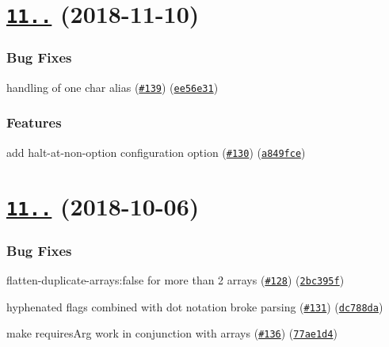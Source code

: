 \label{_11.1.0}%
 \section*{\href{https://github.com/yargs/yargs-parser/compare/v11.0.0...v11.1.0}{\tt 11..} (2018-\/11-\/10)}

\subsubsection*{Bug Fixes}


\begin{DoxyItemize}
\item handling of one char alias (\href{https://github.com/yargs/yargs-parser/issues/139}{\tt \#139}) (\href{https://github.com/yargs/yargs-parser/commit/ee56e31}{\tt ee56e31})
\end{DoxyItemize}

\subsubsection*{Features}


\begin{DoxyItemize}
\item add halt-\/at-\/non-\/option configuration option (\href{https://github.com/yargs/yargs-parser/issues/130}{\tt \#130}) (\href{https://github.com/yargs/yargs-parser/commit/a849fce}{\tt a849fce})
\end{DoxyItemize}

\label{_11.0.0}%
 \section*{\href{https://github.com/yargs/yargs-parser/compare/v10.1.0...v11.0.0}{\tt 11..} (2018-\/10-\/06)}

\subsubsection*{Bug Fixes}


\begin{DoxyItemize}
\item flatten-\/duplicate-\/arrays\+:false for more than 2 arrays (\href{https://github.com/yargs/yargs-parser/issues/128}{\tt \#128}) (\href{https://github.com/yargs/yargs-parser/commit/2bc395f}{\tt 2bc395f})
\item hyphenated flags combined with dot notation broke parsing (\href{https://github.com/yargs/yargs-parser/issues/131}{\tt \#131}) (\href{https://github.com/yargs/yargs-parser/commit/dc788da}{\tt dc788da})
\item make requires\+Arg work in conjunction with arrays (\href{https://github.com/yargs/yargs-parser/issues/136}{\tt \#136}) (\href{https://github.com/yargs/yargs-parser/commit/77ae1d4}{\tt 77ae1d4})
\end{DoxyItemize}

